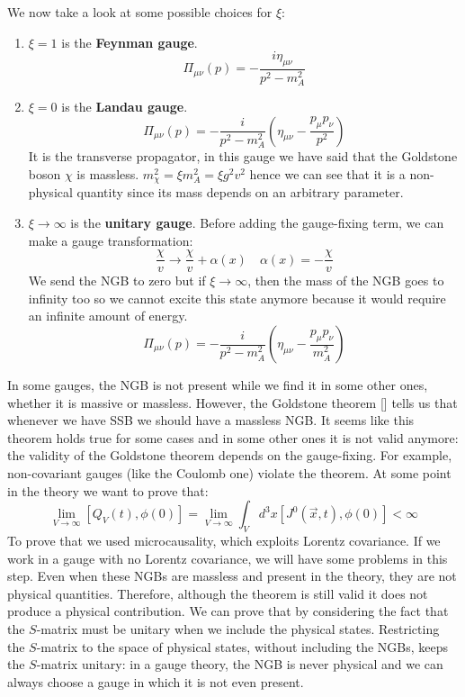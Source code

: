 \documentclass[../main.tex]{subfiles}
\begin{document}
We now take a look at some possible choices for $\xi$:
\begin{enumerate}
    \item $\xi=1$ is the \textbf{Feynman gauge}.
    \[
    \Pi_{\mu\nu}(p)=-\frac{i\eta_{\mu\nu}}{p^2-m_A^2}
    \]
    \item $\xi=0$ is the \textbf{Landau gauge}.
    \[
    \Pi_{\mu\nu}(p)=-\frac{i}{p^2-m_A^2}\left(\eta_{\mu\nu}-\frac{p_\mu p_\nu}{p^2}\right)
    \]
    It is the transverse propagator, in this gauge we have said that the Goldstone boson $\chi$ is massless. $m_\chi^2=\xi m_A^2=\xi g^2v^2$ hence we can see that it is a non-physical quantity since its mass depends on an arbitrary parameter.
    \item $\xi\to\infty$ is the \textbf{unitary gauge}. Before adding the gauge-fixing term, we can make a gauge transformation:
    \[
    \frac{\chi}{v}\to\frac{\chi}{v}+\alpha(x) \quad \alpha(x)=-\frac{\chi}{v} 
    \]
    We send the NGB to zero but if $\xi\to\infty$, then the mass of the NGB goes to infinity too so we cannot excite this state anymore because it would require an infinite amount of energy.
    \[
    \Pi_{\mu\nu}(p)=-\frac{i}{p^2-m_A^2}\left(\eta_{\mu\nu}-\frac{p_\mu p_\nu}{m_A^2}\right)
    \]
\end{enumerate}
In some gauges, the NGB is not present while we find it in some other ones, whether it is massive or massless. However, the Goldstone theorem [] tells us that whenever we have SSB we should have a massless NGB. It seems like this theorem holds true for some cases and in some other ones it is not valid anymore: the validity of the Goldstone theorem depends on the gauge-fixing. For example, non-covariant gauges (like the Coulomb one) violate the theorem. At some point in the theory we want to prove that:
\[
\lim_{V\to\infty}[Q_V(t),\phi(0)]=\lim_{V\to\infty}\int_Vd^3x[J^0(\Vec{x},t),\phi(0)]<\infty
\]
To prove that we used microcausality, which exploits Lorentz covariance. If we work in a gauge with no Lorentz covariance, we will have some problems in this step. Even when these NGBs are massless and present in the theory, they are not physical quantities. Therefore, although the theorem is still valid it does not produce a physical contribution. We can prove that by considering the fact that the $S$-matrix must be unitary when we include the physical states. Restricting the $S$-matrix to the space of physical states, without including the NGBs, keeps the $S$-matrix unitary: in a gauge theory, the NGB is never physical and we can always choose a gauge in which it is not even present.\\
\end{document}
